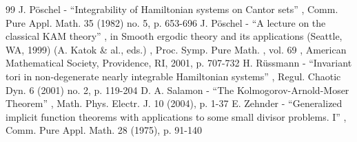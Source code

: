 \documentclass[11pt]{article}
\begin{document}
\begin{thebibliography}{99}
 J. Pöschel - “Integrability of Hamiltonian systems on Cantor sets” , Comm. Pure Appl. Math. 35 (1982) no. 5, p. 653-696
 J. Pöschel - “A lecture on the classical KAM theory” , in Smooth ergodic theory and its applications (Seattle, WA, 1999) (A. Katok \& al., eds.) , Proc. Symp. Pure Math. , vol. 69 , American Mathematical Society, Providence, RI, 2001, p. 707-732
 H. Rüssmann - “Invariant tori in non-degenerate nearly integrable Hamiltonian systems” , Regul. Chaotic Dyn. 6 (2001) no. 2, p. 119-204
 D. A. Salamon - “The Kolmogorov-Arnold-Moser Theorem” , Math. Phys. Electr. J. 10 (2004), p. 1-37
 E. Zehnder - “Generalized implicit function theorems with applications to some small divisor problems. I” , Comm. Pure Appl. Math. 28 (1975), p. 91-140
\end{thebibliography}
\end{document}
